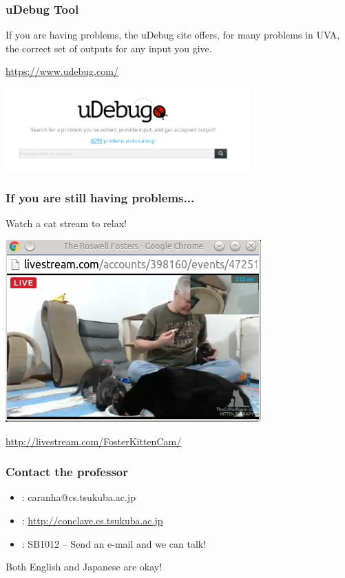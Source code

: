 \documentclass{beamer}
\begin{document}
\begin{frame}
  \frametitle{uDebug Tool}

  If you are having problems, the uDebug site offers, for many
  problems in UVA, the correct set of outputs for any input you give.

  \bigskip

  \url{https://www.udebug.com/}

  \bigskip

  \begin{center}
    \includegraphics[width=0.7\textwidth]{../img/udebug}
  \end{center}
\end{frame}

\begin{frame}
  \frametitle{If you are still having problems...}

  Watch a cat stream to relax!

  \bigskip

  \begin{center}
    \includegraphics[width=.6\textwidth]{../img/catstream}
  \end{center}

  \bigskip

  \url{http://livestream.com/FosterKittenCam/}
\end{frame}


\begin{frame}
  \frametitle{Contact the professor}
  \begin{itemize}
  \item {}: caranha@cs.tsukuba.ac.jp
  \item {}: \url{http://conclave.cs.tsukuba.ac.jp}

    \bigskip

  \item {}: SB1012 -- Send an e-mail and we can talk!\\
  \end{itemize}

  \bigskip

  Both English and Japanese are okay!
\end{frame}
\end{document}
